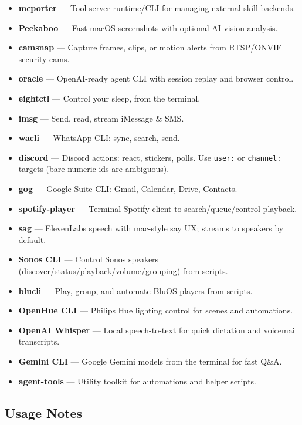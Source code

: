 \begin{itemize}
  \item \textbf{mcporter} — Tool server runtime/CLI for managing external skill backends.
  \item \textbf{Peekaboo} — Fast macOS screenshots with optional AI vision analysis.
  \item \textbf{camsnap} — Capture frames, clips, or motion alerts from RTSP/ONVIF security cams.
  \item \textbf{oracle} — OpenAI-ready agent CLI with session replay and browser control.
  \item \textbf{eightctl} — Control your sleep, from the terminal.
  \item \textbf{imsg} — Send, read, stream iMessage \& SMS.
  \item \textbf{wacli} — WhatsApp CLI: sync, search, send.
  \item \textbf{discord} — Discord actions: react, stickers, polls. Use \texttt{user:} or \texttt{channel:} targets (bare numeric ids are ambiguous).
  \item \textbf{gog} — Google Suite CLI: Gmail, Calendar, Drive, Contacts.
  \item \textbf{spotify-player} — Terminal Spotify client to search/queue/control playback.
  \item \textbf{sag} — ElevenLabs speech with mac-style say UX; streams to speakers by default.
  \item \textbf{Sonos CLI} — Control Sonos speakers (discover/status/playback/volume/grouping) from scripts.
  \item \textbf{blucli} — Play, group, and automate BluOS players from scripts.
  \item \textbf{OpenHue CLI} — Philips Hue lighting control for scenes and automations.
  \item \textbf{OpenAI Whisper} — Local speech-to-text for quick dictation and voicemail transcripts.
  \item \textbf{Gemini CLI} — Google Gemini models from the terminal for fast Q\&A.
  \item \textbf{agent-tools} — Utility toolkit for automations and helper scripts.
\end{itemize}


\subsection{Usage Notes}


